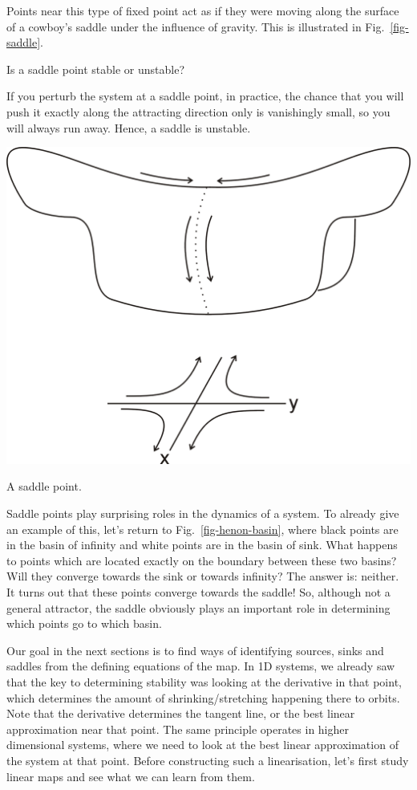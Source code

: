Points near this type of fixed point act as if they were moving along the surface of a cowboy's saddle under the influence of gravity. This is illustrated in Fig.~\ref{fig-saddle}.

\begin{cue}
Is a saddle point stable or unstable?
\end{cue}

If you perturb the system at a saddle point, in practice, the chance that you will push it exactly along the attracting direction only is vanishingly small, so you will always run away. Hence, a saddle is unstable.

\begin{marginfigure}
\centering
\includegraphics{dynamic/figures/saddle}
\caption{A saddle point.}
\label{fig-saddle}
\end{marginfigure} 

Saddle points play surprising roles in the dynamics of a system. To already give an example of this, let's return to Fig.~\ref{fig-henon-basin}, where black points are in the basin of infinity and white points are in the basin of sink. What happens to points which are located exactly on the boundary between these two basins? Will they converge towards the sink or towards infinity? The answer is: neither. It turns out that these points converge towards the saddle! So, although not a general attractor, the saddle obviously plays an important role in determining which points go to which basin.

Our goal in the next sections is to find ways of identifying sources, sinks and saddles from the defining equations of the map. In 1D systems, we already saw that the key to determining stability was looking at the derivative in that point, which determines the amount of shrinking/stretching happening there to orbits. Note that the derivative determines the tangent line, or the best linear approximation near that point. The same principle operates in higher dimensional systems, where we need to look at the best linear approximation of the system at that point. Before constructing such a linearisation, let's first study linear maps and see what we can learn from them.

